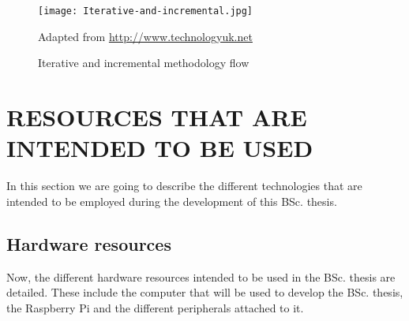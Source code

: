 \documentclass{pre-tfg}
\begin{document}
\begin{figure}[!h]
	\begin{center}
		\texttt{[image: Iterative-and-incremental.jpg]}
		\caption{Iterative and incremental methodology flow}
		\label{fig:5-Iterative-and-incremental}{Adapted from  \url{http://www.technologyuk.net}}
	\end{center}
\end{figure}


\section{RESOURCES THAT ARE INTENDED TO BE USED}

In this section we are going to describe the different technologies that are intended to be employed during the development of this BSc. thesis.

\subsection{Hardware resources}
Now, the different hardware resources intended to be used in the BSc. thesis are detailed. These include the computer that will be used to develop the BSc. thesis, the Raspberry Pi and the different peripherals attached to it. \vspace{-2mm}
\end{document}
